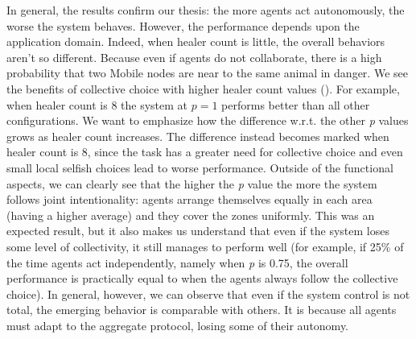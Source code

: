 \documentclass[jsan,article,accept,moreauthors,pdftex]{Definitions/mdpi}
\begin{document}
\begin{paracol}{2}
\switchcolumn


In general, the results confirm our thesis: 
 the more agents act autonomously, the worse the system behaves. 
 However, the performance depends upon the application domain. 
 Indeed, when {healer count} is little, the overall behaviors aren't so different. 
 Because even if agents do not  collaborate, there is a high probability that two {Mobile nodes}
 are near to the same animal in danger.
%
We see the benefits of collective choice with higher healer count values ().
 For example, when {healer count} is $8$ the system at $p=1$ performs better than all other configurations. 
 We want to emphasize how the difference w.r.t. the other \emph{p} values grows as {healer count} increases. 
 The difference instead becomes marked when {healer count} is 8, 
 since the task has a greater need for collective choice and even small local selfish choices lead to worse performance.
%
Outside of the functional aspects, we can clearly see that the higher the \emph{p} value 
 the more the system follows joint intentionality: agents arrange themselves equally in each area (having a higher average)
 and they cover the zones uniformly.
%
This was an expected result, but it also makes us understand that even if the system 
 loses some level of collectivity, it still manages to perform well 
 (for example, if 25\% of the time agents act independently, namely when \emph{p} is 0.75, 
 the overall performance is practically equal to when the agents 
 always follow the collective choice).
%
In general, however, we can observe that even if the system control is not total,
 the emerging behavior is comparable with others.
%
It is because all agents must adapt to the aggregate protocol, losing some of their autonomy.
\end{paracol}
\nointerlineskip
\end{document}
